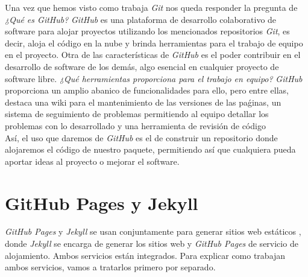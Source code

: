 \documentclass[a4paper, 12pt]{book}
\begin{document}
Una vez que hemos visto como trabaja \emph{Git} nos queda responder la pregunta de \textit{¿Qué es GitHub?} \emph{GitHub} es una plataforma de desarrollo colaborativo de software para alojar proyectos utilizando los mencionados repositorios \emph{Git}, es decir, aloja el código en la nube y brinda herramientas para el trabajo de equipo en el proyecto. Otra de las características de \emph{GitHub} es el poder contribuir en el desarrollo de software de los demás, algo esencial en cualquier proyecto de software libre. \textit{¿Qué herramientas proporciona para el trabajo en equipo?} \emph{GitHub} proporciona un amplio abanico de funcionalidades para ello, pero entre ellas, destaca una wiki para el mantenimiento de las versiones de las paǵinas, un sistema de seguimiento de problemas permitiendo al equipo detallar los problemas con lo desarrollado y una herramienta de revisión de código \\ %
Así, el uso que daremos de \emph{GitHub} es el de construir un repositorio donde alojaremos el código de nuestro paquete, permitiendo así que cualquiera pueda aportar ideas al proyecto o mejorar el software.

\section{GitHub Pages y Jekyll}
\label{sec:githubJekyll}
\emph{GitHub Pages} y \emph{Jekyll} se usan conjuntamente para generar sitios web estáticos , donde \emph{Jekyll} se encarga de generar los sitios web y \emph{GitHub Pages} de servicio de alojamiento. Ambos servicios están integrados. Para explicar como trabajan ambos servicios, vamos a tratarlos primero por separado.
\end{document}
